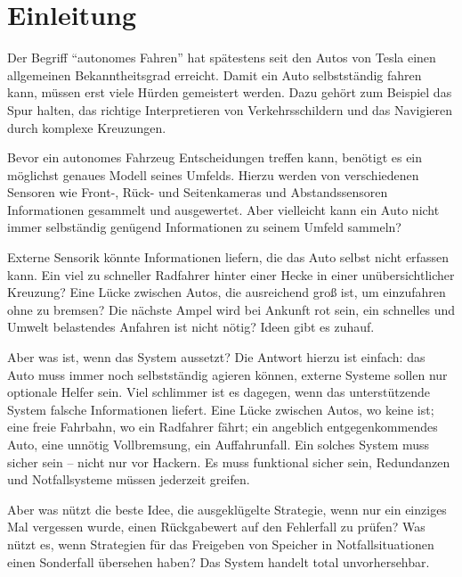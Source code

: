 
\chapter{Einleitung}

Der Begriff \enquote{autonomes Fahren} hat spätestens seit den Autos von Tesla einen allgemeinen Bekanntheitsgrad erreicht. Damit ein Auto selbstständig fahren kann, müssen erst viele Hürden gemeistert werden.
Dazu gehört zum Beispiel das Spur halten, das richtige Interpretieren von Verkehrsschildern und das Navigieren durch komplexe Kreuzungen.

Bevor ein autonomes Fahrzeug Entscheidungen treffen kann, benötigt es ein möglichst genaues Modell seines Umfelds.
Hierzu werden von verschiedenen Sensoren wie Front-, Rück- und Seitenkameras und Abstandssensoren Informationen gesammelt und ausgewertet.
Aber vielleicht kann ein Auto nicht immer selbständig genügend Informationen zu seinem Umfeld sammeln? %

Externe Sensorik könnte Informationen liefern, die das Auto selbst nicht erfassen kann.
Ein viel zu schneller Radfahrer hinter einer Hecke in einer unübersichtlicher Kreuzung?
Eine Lücke zwischen Autos, die ausreichend groß ist, um einzufahren ohne zu bremsen?
Die nächste Ampel wird bei Ankunft rot sein, ein schnelles und Umwelt belastendes Anfahren ist nicht nötig?
Ideen gibt es zuhauf.

Aber was ist, wenn das System aussetzt?
Die Antwort hierzu ist einfach: das Auto muss immer noch selbstständig agieren können, externe Systeme sollen nur optionale Helfer sein.
Viel schlimmer ist es dagegen, wenn das unterstützende System falsche Informationen liefert.
Eine Lücke zwischen Autos, wo keine ist; eine freie Fahrbahn, wo ein Radfahrer fährt; ein angeblich entgegenkommendes Auto, eine unnötig Vollbremsung, ein Auffahrunfall.
Ein solches System muss sicher sein -- nicht nur vor Hackern.
Es muss funktional sicher sein, Redundanzen und Notfallsysteme müssen jederzeit greifen.

Aber was nützt die beste Idee, die ausgeklügelte Strategie, wenn nur ein einziges Mal vergessen wurde, einen Rückgabewert auf den Fehlerfall zu prüfen?
Was nützt es, wenn Strategien für das Freigeben von Speicher in Notfallsituationen einen Sonderfall übersehen haben?
Das System handelt total unvorhersehbar.

